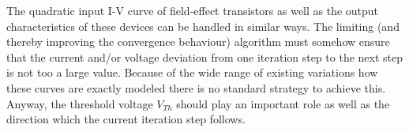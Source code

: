 \addvspace{12pt}

The quadratic input I-V curve of field-effect transistors as well as
the output characteristics of these devices can be handled in similar
ways.  The limiting (and thereby improving the convergence behaviour)
algorithm must somehow ensure that the current and/or voltage
deviation from one iteration step to the next step is not too a large
value.  Because of the wide range of existing variations how these
curves are exactly modeled there is no standard strategy to achieve
this.  Anyway, the threshold voltage $V_{Th}$ should play an important
role as well as the direction which the current iteration step
follows.
